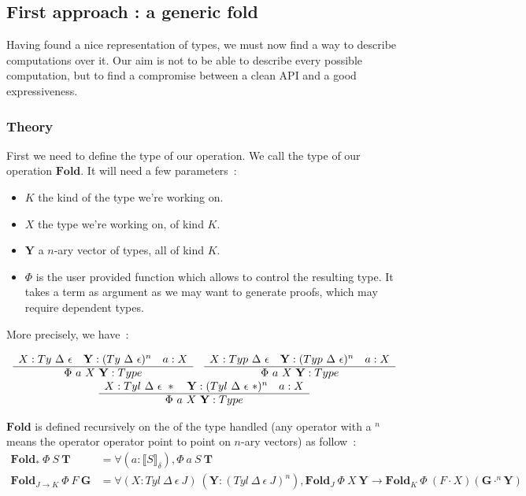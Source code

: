 \documentclass{article}
\newcommand{\lbr}{\llbracket}
\newcommand{\rbr}{\rrbracket}
\newcommand{\sem}[1]{\lbr {#1} \rbr}
\newcommand{\fld}{\mathbf{Fold}}
\newcommand{\irule}[2]{\begin{array}{c} {#1} \\\hline {#2}\\ \end{array}}
\begin{document}
\subsection{First approach : a generic fold}

Having found a nice representation of types, we must now find a way to describe
computations over it. Our aim is not to be able to describe every possible
computation, but to find a compromise between a clean API and a good
expressiveness.

\subsubsection{Theory}

First we need to define the type of our operation. We call the type of our
operation $\fld$. It will need a few parameters~:\begin{itemize}
    \item $K$ the kind of the type we're working on.
    \item $X$ the type we're working on, of kind $K$.
    \item $\mathbf{Y}$ a $n$-ary vector of types, all of kind $K$.
    \item $\Phi$ is the user provided function which allows to control the
        resulting type. It takes a term as argument as we may want to generate
        proofs, which may require dependent types.
\end{itemize}

More precisely, we have~:

\[\begin{array}{cc}
    \irule{X : Ty\ \Delta\ \epsilon\quad \mathbf{Y} : (Ty\ \Delta\ \epsilon)^n\quad a : X}
        {\Phi\ a\ X\ \mathbf{Y} : Type}
    & \irule{X : Typ\ \Delta\ \epsilon\quad \mathbf{Y} : (Typ\ \Delta\ \epsilon)^n\quad a : X}
        {\Phi\ a\ X\ \mathbf{Y} : Type}
    \\
    \multicolumn{2}{c}{
        \irule{X : Tyl\ \Delta\ \epsilon\ *\quad \mathbf{Y} : (Tyl\ \Delta\ \epsilon\ *)^n\quad a : X}
        {\Phi\ a\ X\ \mathbf{Y} : Type}}
    \\
\end{array}\]

$\fld$ is defined recursively on the of the type handled (any operator with a
$^n$ means the operator operator point to point on $n$-ary vectors) as follow~: 
\begin{align*}
    \fld_*\ \Phi\ S\ \mathbf{T} &= \forall (a : \sem{S}_\delta),\Phi\ a\ S\ \mathbf{T} \\
    \fld_{J\rightarrow K}\ \Phi\ F\ \mathbf{G} &= \forall (X : Tyl\ \Delta\ \epsilon\ J)
        \ (\mathbf{Y} : (Tyl\ \Delta\ \epsilon\ J)^n),
        \fld_J\ \Phi\ X\ \mathbf{Y} \rightarrow\fld_K\ \Phi\ (F\cdot X) (\mathbf{G}\cdot^n\mathbf{Y})
\end{align*}
\end{document}
